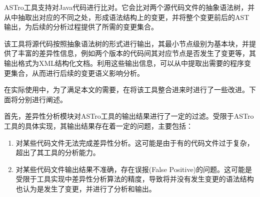 %
%
%
%

ASTro工具支持对Java代码进行比对。它会比对两个源代码文件的抽象语法树，并从中抽取出对应的不同之处，形成语法结构上的变更，并将整个变更前后的AST输出，为后续的分析过程提供了所需的变更集合。

该工具将源代码按照抽象语法树的形式进行输出，其最小节点级别为基本块，并提供了丰富的差异性信息，例如两个版本的代码间其对应节点是否发生了变更等，其输出格式为XML结构化文档。利用这些输出信息，可以从中提取出需要的程序变更集合，从而进行后续的变更语义影响分析。

在实际使用中，为了满足本文的需要，在将该工具整合进来时进行了一些改进。下面将分别进行阐述。

首先，差异性分析模块对ASTro工具的输出结果进行了一定的过滤。受限于ASTro工具的具体实现，其输出结果存在着一定的问题，主要包括：
\begin{enumerate}
	\item 对某些代码文件无法完成差异性分析。这可能是由于有的代码文件过于复杂，超出了其工具的分析能力。
	\item 对某些代码文件输出结果不准确，存在误报(False Positive)的问题。这可能是受限于工具实现中差异性分析算法的精度，导致将并没有发生变更的语法结构也认为是发生了变更，并进行了分析和输出。
\end{enumerate}

